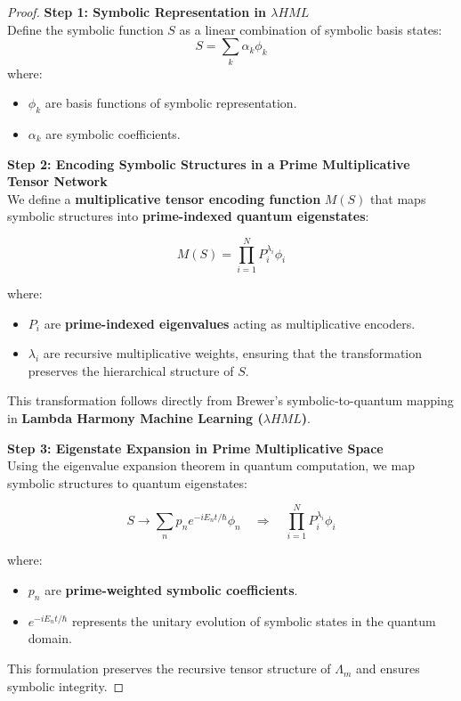 \documentclass{article}
\theoremstyle{plain}
\begin{document}
\begin{proof}
\textbf{Step 1: Symbolic Representation in \(\lambda HML\)}\\
Define the symbolic function \( S \) as a linear combination of symbolic basis states:
\[
S = \sum_{k} \alpha_k \phi_k
\]
where:
\begin{itemize}
    \item \( \phi_k \) are basis functions of symbolic representation.
    \item \( \alpha_k \) are symbolic coefficients.
\end{itemize}

\textbf{Step 2: Encoding Symbolic Structures in a Prime Multiplicative Tensor Network}\\
We define a \textbf{multiplicative tensor encoding function} \( M(S) \) that maps symbolic structures into \textbf{prime-indexed quantum eigenstates}:

\[
M(S) = \prod_{i=1}^{N} P_i^{\lambda_i} \phi_i
\]

where:
\begin{itemize}
    \item \( P_i \) are \textbf{prime-indexed eigenvalues} acting as multiplicative encoders.
    \item \( \lambda_i \) are recursive multiplicative weights, ensuring that the transformation preserves the hierarchical structure of \( S \).
\end{itemize}

This transformation follows directly from Brewer’s symbolic-to-quantum mapping in \textbf{Lambda Harmony Machine Learning (\(\lambda HML\))}.

\textbf{Step 3: Eigenstate Expansion in Prime Multiplicative Space}\\
Using the eigenvalue expansion theorem in quantum computation, we map symbolic structures to quantum eigenstates:

\[
S \to \sum_{n} p_n e^{-i E_n t / \hbar} \phi_n \quad \Rightarrow \quad \prod_{i=1}^{N} P_i^{\lambda_i} \phi_i
\]

where:
\begin{itemize}
    \item \( p_n \) are \textbf{prime-weighted symbolic coefficients}.
    \item \( e^{-i E_n t / \hbar} \) represents the unitary evolution of symbolic states in the quantum domain.
\end{itemize}

This formulation preserves the recursive tensor structure of \( \Lambda_m \) and ensures symbolic integrity.


\end{proof}
\end{document}
